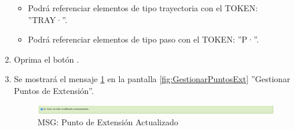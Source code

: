 \begin{enumerate}
			\begin{itemize}
				\item Podrá referenciar elementos de tipo trayectoria con el TOKEN: ''TRAY·''.
				\item Podrá referenciar elementos de tipo paso con el TOKEN: ''P·''.
			\end{itemize}
						
			\item Oprima el botón \IUAceptar.
			
			\item Se mostrará el mensaje \ref{fig:pextModificada} en la pantalla \ref{fig:GestionarPuntosExt} ''Gestionar Puntos de Extensión''.
			
			\begin{figure}[htbp!]
				\begin{center}
					\includegraphics[scale=0.5]{roles/lider/actor/pantallas/IU10-2MSG1}
					\caption{MSG: Punto de Extensión Actualizado}
					\label{fig:pextModificada}
				\end{center}
			\end{figure}
			\end{enumerate}